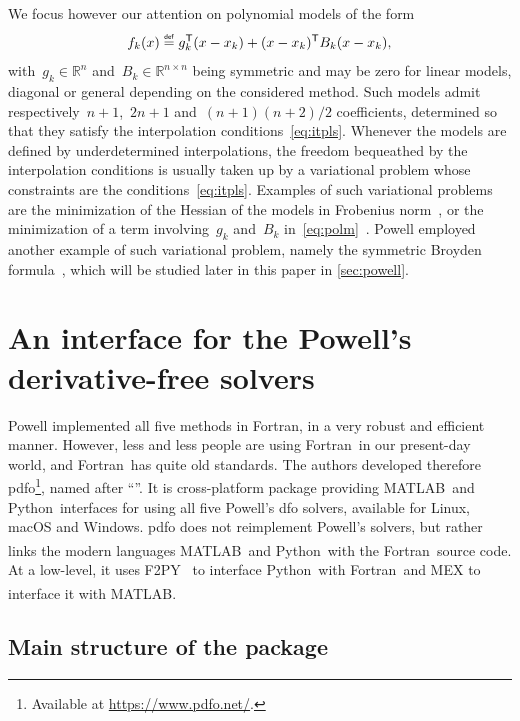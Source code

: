 \documentclass[11pt,draft]{article}
\numberwithin{equation}{section}
\def\defeq{\ensuremath{\mathrel{\stackrel{\text{\tiny\textsf{def}}}{=}}}}
\def\sft{\ensuremath{\mathsf{T}}}
\def\R{\ensuremath{\mathbb{R}}}
\def\obj{\ensuremath{f}}
\newcommand\objmdl[1][k]{\obj_{#1}}
\newcommand\iter[1][k]{x_{#1}}
\newcommand\grad[1][k]{g_{#1}}
\newcommand\hess[1][k]{B_{#1}}
\def\fortran{\mbox{Fortran}}
\def\matlab{\mbox{MATLAB\textsuperscript{\textregistered}}}
\def\python{\mbox{Python}}
\begin{document}
We focus however our attention on polynomial models of the form
\begin{equation}
    \label{eq:polm}
    \objmdl(x) \defeq \grad^{\sft} (x - \iter) + (x - \iter)^{\sft} \hess (x - \iter),
\end{equation}
with~$\grad \in \R^n$ and~$\hess \in \R^{n \times n}$ being symmetric and may be zero for linear models, diagonal or general depending on the considered method.
Such models admit respectively~$n + 1$,~$2n + 1$ and~$(n + 1)(n + 2) / 2$ coefficients, determined so that they satisfy the interpolation conditions~\cref{eq:itpls}.
Whenever the models are defined by underdetermined interpolations, the freedom bequeathed by the interpolation conditions is usually taken up by a variational problem whose constraints are the conditions~\cref{eq:itpls}.
Examples of such variational problems are the minimization of the Hessian of the models in Frobenius norm~\cite{Conn_Scheinberg_Toint_1998, Wild_2008}, or the minimization of a term involving~$\grad$ and~$\hess$ in~\cref{eq:polm}~\cite{Conn_Toint_1996}.
Powell employed another example of such variational problem, namely the symmetric Broyden formula~\cite{Powell_1970b, Powell_2004a}, which will be studied later in this paper in \cref{sec:powell}.

\section{An interface for the Powell's derivative-free solvers}
\label{sec:pdfo}

Powell implemented all five methods in \fortran, in a very robust and efficient manner.
However, less and less people are using \fortran\ in our present-day world, and \fortran\ has quite old standards.
The authors developed therefore \gls{pdfo}\footnote{Available at \url{https://www.pdfo.net/}.}, named after \enquote{}.
It is cross-platform package providing \matlab\ and \python\ interfaces for using all five Powell's \gls{dfo} solvers, available for Linux, macOS and Windows.
\Gls{pdfo} does not reimplement Powell's solvers, but rather links the modern languages \matlab\ and \python\ with the \fortran\ source code.
At a low-level, it uses F2PY~\cite{Peterson_2009} to interface \python\ with \fortran\, and MEX to interface it with \matlab.

\subsection{Main structure of the package}
\end{document}

